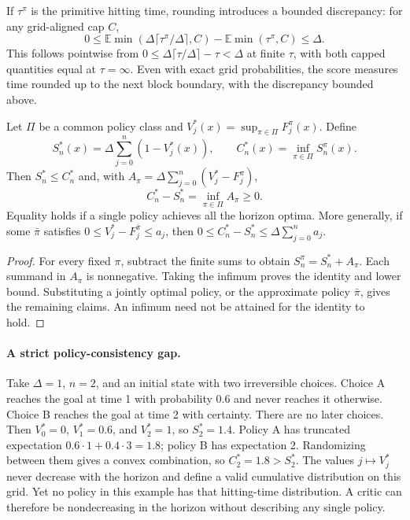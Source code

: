 \documentclass{article} %
\newcommand{\EE}{\mathbb E}
\theoremstyle{definition}
\theoremstyle{remark}
\begin{document}
If $\tau^\pi$ is the primitive hitting time, rounding introduces a bounded discrepancy:
for any grid-aligned cap $C$,
\[
 0\le
 \EE\min(\Delta\lceil\tau^\pi/\Delta\rceil,C)
       -\EE\min(\tau^\pi,C)
 \le\Delta.
\]
This follows pointwise from $0\le\Delta\lceil\tau/\Delta\rceil-\tau<\Delta$ at
finite $\tau$, with both capped quantities equal at $\tau=\infty$.
Even with exact grid probabilities, the score measures time rounded up to the next
block boundary, with the discrepancy bounded above.

\begin{proposition}
\label{prop:policy-consistency}
Let $\Pi$ be a common policy class and
$V_j^*(x)=\sup_{\pi\in\Pi}F_j^\pi(x)$.
Define
\[
 S_n^*(x)=\Delta\sum_{j=0}^{n}(1-V_j^*(x)),\qquad
 C_n^*(x)=\inf_{\pi\in\Pi}S_n^\pi(x).
\]
Then $S_n^*\le C_n^*$ and, with $A_\pi=\Delta\sum_{j=0}^{n}(V_j^*-F_j^\pi)$,
\begin{equation}
 C_n^*-S_n^*=\inf_{\pi\in\Pi} A_\pi\ge0.
 \label{eq:consistency-gap}
\end{equation}
Equality holds if a single policy achieves all the horizon optima.
More generally, if some $\bar\pi$ satisfies
$0\le V_j^*-F_j^{\bar\pi}\le a_j$, then
$0\le C_n^*-S_n^*\le\Delta\sum_{j=0}^{n}a_j$.
\end{proposition}
\begin{proof}
For every fixed $\pi$, subtract the finite sums to obtain
$S_n^\pi=S_n^*+A_\pi$. Each summand in $A_\pi$ is nonnegative.
Taking the infimum proves the identity and lower bound. Substituting a jointly
optimal policy, or the approximate policy $\bar\pi$, gives the remaining claims.
An infimum need not be attained for the identity to hold.
\end{proof}

\paragraph{A strict policy-consistency gap.}
Take $\Delta=1$, $n=2$, and an initial state with two irreversible choices.
Choice A reaches the goal at time 1 with probability 0.6 and never reaches it otherwise.
Choice B reaches the goal at time 2 with certainty. There are no later choices.
Then $V_0^*=0$, $V_1^*=0.6$, and $V_2^*=1$, so $S_2^*=1.4$.
Policy A has truncated expectation $0.6\cdot1+0.4\cdot3=1.8$;
policy B has expectation 2. Randomizing between them gives a convex combination,
so $C_2^*=1.8>S_2^*$.
The values $j\mapsto V_j^*$ never decrease with the horizon and define a valid cumulative
distribution on this grid. Yet no policy in this example has that hitting-time distribution.
A critic can therefore be nondecreasing in the horizon without describing any single policy.
\end{document}
